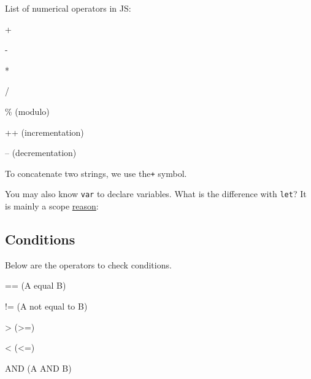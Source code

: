 \documentclass[]{book}
\newenvironment{Shaded}{\begin{snugshade}}{\end{snugshade}}
\newcommand{\AttributeTok}[1]{\textcolor[rgb]{0.77,0.63,0.00}{#1}}
\newcommand{\CommentTok}[1]{\textcolor[rgb]{0.56,0.35,0.01}{\textit{#1}}}
\newcommand{\DecValTok}[1]{\textcolor[rgb]{0.00,0.00,0.81}{#1}}
\newcommand{\KeywordTok}[1]{\textcolor[rgb]{0.13,0.29,0.53}{\textbf{#1}}}
\newcommand{\NormalTok}[1]{#1}
\newcommand{\OperatorTok}[1]{\textcolor[rgb]{0.81,0.36,0.00}{\textbf{#1}}}
\newcommand{\SpecialCharTok}[1]{\textcolor[rgb]{0.00,0.00,0.00}{#1}}
\newcommand{\VariableTok}[1]{\textcolor[rgb]{0.00,0.00,0.00}{#1}}
\newcommand{\VerbatimStringTok}[1]{\textcolor[rgb]{0.31,0.60,0.02}{#1}}
\begin{document}
List of numerical operators in JS:

+

-

*

/

\% (modulo)

++ (incrementation)

-- (decrementation)

To concatenate two strings, we use the\texttt{+} symbol.

You may also know \texttt{var} to declare variables. What is the difference with \texttt{let}? It is mainly a scope \href{https://www.w3schools.com/js/js_let.asp}{reason}:

\begin{Shaded}
\end{Shaded}

\hypertarget{conditions}{%
\subsection{Conditions}\label{conditions}}

Below are the operators to check conditions.

== (A equal B)

!= (A not equal to B)

\textgreater{} (\textgreater{}=)

\textless{} (\textless{}=)

AND (A AND B)
\end{document}
